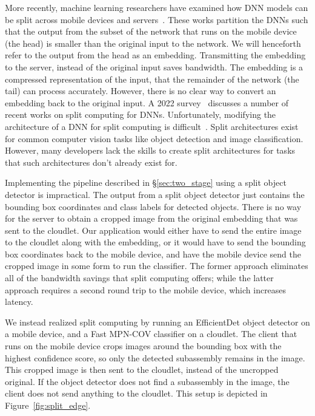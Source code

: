 More recently, machine learning researchers have examined how DNN models can be
split across mobile devices and servers~\cite{Kang2017, Hsu2019, Eshratifar2019,
  Matsubara2019}.
These works partition the DNNs such that the output from the subset of the
network that runs on the mobile device (the head) is smaller than the
original input to the network.
We will henceforth refer to the output from the head as an embedding.
Transmitting the embedding to the server, instead of the original input saves
bandwidth.
The embedding is a compressed representation of the input, that the remainder of
the network (the tail) can process accurately.
However, there is no clear way to convert an embedding back to the original
input.
A 2022 survey~\cite{Matsubara2022} discusses a number of recent works on split
computing for DNNs.
Unfortunately, modifying the architecture of a DNN for split computing is
difficult~\cite{Matsubara2020}.
Split architectures exist for common computer vision tasks like object detection
and image classification.
However, many developers lack the skills to create split architectures for tasks
that such architectures don't already exist for.

Implementing the pipeline described in \S\ref{sec:two_stage} using a split
object detector is impractical.
The output from a split object detector just contains the bounding box
coordinates and class labels for detected objects.
There is no way for the server to obtain a cropped image from the original
embedding that was sent to the cloudlet.
Our application would either have to send the entire image to the cloudlet along
with the embedding, or it would have to send the bounding box coordinates back
to the mobile device, and have the mobile device send the cropped image in some
form to run the classifier.
The former approach eliminates all of the bandwidth savings that split computing
offers; while the latter approach requires a second round trip to the mobile
device, which increases latency.

We instead realized split computing by running an EfficientDet object detector
on a mobile device, and a Fast MPN-COV classifier on a cloudlet.
The client that runs on the mobile device crops images around the bounding box
with the highest confidence score, so only the detected subassembly remains in
the image.
This cropped image is then sent to the cloudlet, instead of the uncropped
original.
If the object detector does not find a subassembly in the image, the client does
not send anything to the cloudlet.
This setup is depicted in Figure~{\ref{fig:split_edge}}.


